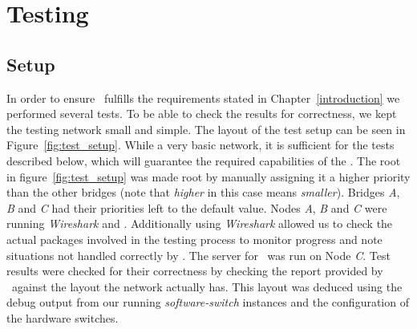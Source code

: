 \chapter{Testing}
\label{testing}
\section{Setup}
In order to ensure \tool\ fulfills the requirements stated in Chapter~\ref{introduction} we performed several tests.
To be able to check the results for correctness, we kept the testing network small and simple.
The layout of the test setup can be seen in Figure~\ref{fig:test_setup}.
While a very basic network, it is sufficient for the tests described below, which will guarantee the required capabilities of the \tool.
The root in figure~\ref{fig:test_setup} was made root by manually assigning it a higher priority than the other bridges (note that \textit{higher} in this case means \textit{smaller}).
Bridges \textit{A}, \textit{B} and \textit{C} had their priorities left to the default value.
Nodes \textit{A}, \textit{B} and \textit{C} were running \textit{Wireshark} and \tool.
Additionally using \textit{Wireshark} allowed us to check the actual packages involved in the testing process to monitor progress and note situations not handled correctly by \tool.
The server for \tool\ was run on Node \textit{C}.
Test results were checked for their correctness by checking the report provided by \tool\ against the layout the network actually has.
This layout was deduced using the debug output from our running \textit{software-switch} instances and the configuration of the hardware switches.

